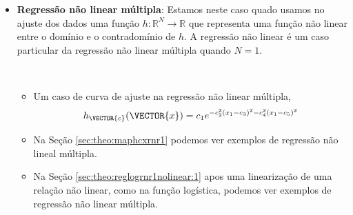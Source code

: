 \begin{itemize}
\item \textbf{Regressão não linear múltipla}: 
Estamos neste caso quado usamos no ajuste dos dados
uma função $h:\mathbb{R}^{N} \rightarrow \mathbb{R}$ 
que representa uma função não linear entre o domínio e o contradomínio de $h$.
A regressão não linear é um caso particular da regressão não linear múltipla quando $N=1$.
\begin{example}~
\begin{itemize}
\item Um caso de curva de ajuste na regressão não linear múltipla, 
\begin{equation}
h_{\VECTOR{c}}(\VECTOR{x})=c_1 e^{- c_2^2(x_1 -c_3)^2- c_4^2(x_1 -c_5)^2}
\end{equation}
\item Na Seção \ref{sec:theo:maphcxrnr1} podemos ver exemplos de regressão não lineal múltipla.
\item Na Seção \ref{sec:theo:reglogrnr1nolinear:1} apos uma linearização de uma relação não linear,
como na função logística, podemos ver exemplos de regressão não linear múltipla.
\end{itemize}
\end{example}
\end{itemize}
